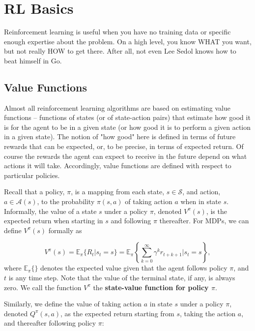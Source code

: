 
\chapter{RL Basics}\label{rl_basics}

Reinforcement learning is useful when you have no training data or specific enough 
expertise about the problem. On a high level, you know WHAT you want, but not really 
HOW to get there. After all, not even Lee Sedol knows how to beat himself in Go.



\section{Value Functions}

Almost all reinforcement learning algorithms are based on estimating value functions 
-- functions of states (or of state-action pairs) that estimate how good it is for 
the agent to be in a given state (or how good it is to perform a given action in a 
given state). The notion of "how good" here is defined in terms of future rewards 
that can be expected, or, to be precise, in terms of expected return. Of course the 
rewards the agent can expect to receive in the future depend on what actions it will 
take. Accordingly, value functions are defined with respect to particular policies.

Recall that a policy, $\pi$, is a mapping from each state, $s\in\mathcal{S}$, and 
action, $a\in\mathcal{A}(s)$, to the probability $\pi(s,a)$ of taking action $a$ 
when in state $s$. Informally, the value of a state $s$ under a policy $\pi$, denoted 
$V^\pi(s)$, is the expected return when starting in $s$ and following $\pi$ thereafter. 
For MDPs, we can define $V^\pi(s)$ formally as

\begin{equation}\label{rl-policy-state-value}
V^\pi(s) = \mathbb{E}_\pi\{R_t|s_t = s\} = 
\mathbb{E}_\pi\left\{ \sum_{k=0}^\infty\gamma^k r_{t+k+1} | s_t = s \right\},
\end{equation}
where $\mathbb{E}_\pi\{ \}$ denotes the expected value given that the agent follows 
policy $\pi$, and $t$ is any time step. Note that the value of the terminal state, if 
any, is always zero. We call the function $V^\pi$ the {\bf state-value function for 
policy $\pi$}.

Similarly, we define the value of taking action $a$ in state $s$ under a policy $\pi$, 
denoted $Q^\pi(s,a)$, as the expected return starting from $s$, taking the action $a$, 
and thereafter following policy $\pi$:

